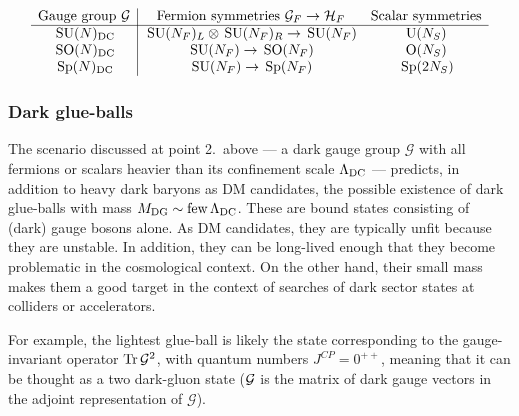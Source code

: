 \begin{table}[t]
$$\begin{array}{c|cc}
\hbox{Gauge group $\mathcal{G}$} & \hbox{Fermion symmetries $\mathcal{G}_F\to \mathcal{H}_F$}   &\hbox{Scalar symmetries} \\ \hline
\,{\rm SU}(N)_{\rm DC} & \,{\rm SU}(N_F)_L\otimes \,{\rm SU}(N_F)_R\to \,{\rm SU}(N_F) &{\rm U}(N_S)  \\
\,{\rm SO}(N)_{\rm DC} & \,{\rm SU}(N_F) \to \,{\rm SO}(N_F) &  \mathrm{O}(N_S) \\
\,{\rm Sp}(N)_{\rm DC} & \,{\rm SU}(N_F)\to \,{\rm Sp}(N_F) & \,{\rm Sp}(2 N_S) 
\end{array}$$
\caption[Patterns of chiral symmetry breaking]{\em\label{tab:chiralSB}  
Assuming the confining dark gauge groups listed in the first column, we show in the second column 
the patterns of chiral symmetry breaking induced by condensates of
$N_F$ light fermions in the fundamental representation.
In the third column we show the symmetry associated to $N_S$ light scalars in the fundamental.
It can be broken by condensates or vacuum expectation values in different ways. 
See, e.g.~\cite{CompositeHiggsDM} for extra details. 
}
\end{table}




\subsubsection{Dark glue-balls} \label{sec:darkglueballs}
The scenario discussed at point 2.\ above --- a dark gauge group $\mathcal{G}$ with all fermions or scalars heavier than its confinement scale
$\Lambda_{\rm DC}$ --- predicts, in addition to heavy dark baryons as DM candidates,
the possible existence of dark glue-balls with mass $M_{\rm DG} \sim \hbox{few}\, \Lambda_{\rm DC}$. These are bound states consisting of (dark) gauge bosons alone. As DM candidates, they are typically unfit because they are unstable.
In addition, they can be long-lived enough that they become problematic in the cosmological context. 
On the other hand, their small mass makes them a good target in the context of searches of dark sector states at colliders or accelerators.

For example, the lightest glue-ball is likely the state corresponding to the gauge-invariant operator
$\hbox{Tr}\, {\cal G}^2$, with quantum numbers
$J^{CP} = 0^{++}$, meaning that it can be thought as a two dark-gluon state (${\cal G}$ is the matrix of dark gauge vectors in the adjoint representation of $\mathcal{G}$).

